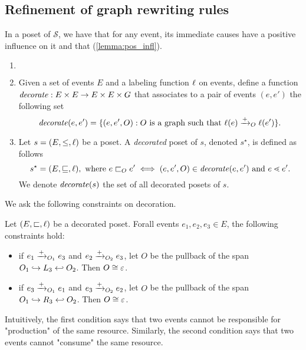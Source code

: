 \subsection{Refinement of graph rewriting rules}

In a poset of $\mathcal{S}$, we have that for any event, its immediate causes have a positive influence on it and that (\autoref{lemma:pos_infl}).

\begin{definition}
  \begin{enumerate}
  \item[] $~$
  \item Given a set of events $E$ and a labeling function $\ell$ on events, define a function $\mathit{decorate}:E\times E \to E\times E\times G$ that associates to a pair of events $(e,e')$ the following set
    \[
    \mathit{decorate}(e,e') = \{(e,e',O) : O\text{ is a graph such that }\ell(e)\mathrel{\xrightarrow{+}}_O \ell(e')\}.
    \]

  \item Let $s = (E,\leq,\ell)$ be a poset. A \emph{decorated} poset of $s$, denoted $s^{\star}$, is defined as follows
    \[
    s^{\star} = (E,\sqsubseteq,\ell), \text{ where }e\sqsubset_O e' \iff (e,e',O)\in\mathit{decorate}(e,e')\text{ and }e\lessdot e'.
    \]
    We denote $\mathit{decorate}(s)$ the set of all decorated posets of $s$.
  \end{enumerate}
\end{definition}

We ask the following constraints on decoration.
\begin{definition}
\label{def:constr_dec}
  Let $(E,\sqsubset,\ell)$ be a decorated poset. Forall events $e_1,e_2,e_3\in E$, the following constraints hold:
  \begin{itemize}
  \item if $e_1\mathrel{\xrightarrow{+}}_{O_1} e_3$ and $e_2\mathrel{\xrightarrow{+}}_{O_2} e_3$, let $O$ be the pullback of the span $O_1\hookrightarrow L_3\hookleftarrow O_2$. Then $O\cong\varepsilon$.
  \item if $e_3\mathrel{\xrightarrow{+}}_{O_1} e_1$ and $e_3\mathrel{\xrightarrow{+}}_{O_2} e_2$, let $O$ be the pullback of the span $O_1\hookrightarrow R_3\hookleftarrow O_2$. Then $O\cong\varepsilon$.
  \end{itemize}
\end{definition}
Intuitively, the first condition says that two events cannot be responsible for "production" of the same resource. Similarly, the second condition says that two events cannot "consume" the same resource.

